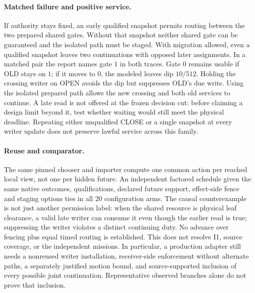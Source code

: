 \documentclass{article}
\begin{document}
\paragraph{Matched failure and positive service.}
If authority stays fixed, an early qualified snapshot permits routing
between the two prepared shared gates. Without that snapshot neither
shared gate can be guaranteed and the isolated path must be staged. With
migration allowed, even a qualified snapshot leaves two continuations
with opposed later assignments. In a matched pair the report names gate
$1$ in both traces. Gate $0$ remains usable if OLD stays on $1$; if it
moves to $0$, the modeled leaves dip $10/512$. Holding the crossing
writer on OPEN avoids the dip but suppresses OLD's due write. Using the
isolated prepared path allows the new crossing and both old services to
continue. A late read is not offered at the frozen decision cut: before
claiming a design limit beyond it, test whether waiting would still meet
the physical deadline. Repeating either unqualified CLOSE or a single
snapshot at every writer update does not preserve lawful service across
this family.

\paragraph{Reuse and comparator.}
The same pinned chooser and importer compute one common action per
reached local view, not one per hidden future. An independent factored
schedule given the same native outcomes, qualifications, declared future
support, effect-side fence and staging options ties in all 20
configuration arms. The causal counterexample is not just another
permission label: when the shared resource is physical leaf clearance,
a valid late writer can consume it even though the earlier read is true;
suppressing the writer violates a distinct continuing duty. No advance
over fencing plus equal timed routing is established. This does not
resolve I1, source coverage, or the independent missions. In particular,
a production adapter still needs a nonreused writer installation,
receiver-side enforcement without alternate paths, a separately justified
motion bound, and source-supported inclusion of every possible joint
continuation. Representative observed branches alone do not prove that
inclusion.
\end{document}
